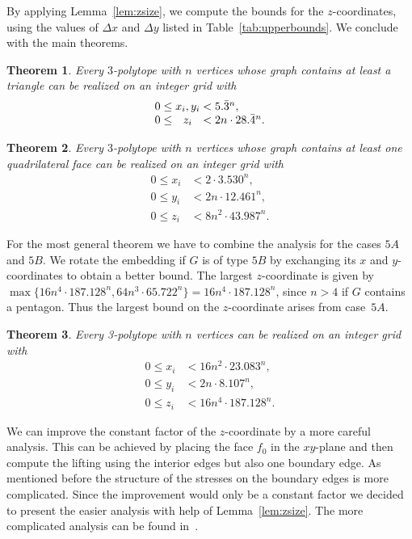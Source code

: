 \documentclass{article}
\theoremstyle{plain} \newtheorem{thm}{Theorem}[section]
\begin{document}
By applying Lemma~\ref{lem:zsize}, we compute the bounds for
the $z$-coordina\-tes, using the values of $\Delta x$ and $\Delta y$
listed in
Table~\ref{tab:upperbounds}. We conclude with the main
theorems.
\begin{thm}
Every $3$-polytope with $n$ vertices whose graph contains at least a triangle can
be realized on an integer grid with 
  \[\setlength{\arraycolsep}{0pt}
\begin{array}{rcl}
    0  \leq{}& x_i,y_i&{} <   5.\bar{3}^n, \\
    0 \leq{}& z_i&{} <   2 n \cdot 28.\bar{4}^n. \\
  \end{array}\]
\end{thm}
\begin{thm}\label{thm:4gon}
Every $3$-polytope with $n$ vertices 
whose graph contains at least one quadrilateral face can
be realized on an integer grid with 
  \begin{align*}
   0  \leq  x_i & <  2 \cdot 3{.}530^n, \\
   0  \leq  y_i & <  2 n \cdot 12{.}46	1^n, \\
   0  \leq  z_i & <  8 n^2 \cdot 43{.}987^n. 
  \end{align*}
\end{thm}
For the most general theorem we have to combine the analysis for the
cases $5A$ and $5B$. We rotate the embedding if $G$ is of type $5B$ by
exchanging its $x$ and $y$-coordinates to obtain a better bound. The
largest $z$-coordinate is given by
$\max\{16 n^4 \cdot 187{.}128^n,64n^3 \cdot 65{.}722^n\}
= 16 n^4 \cdot 187.128^n$,
since $n> 4$ if $G$ contains a
pentagon.
Thus the largest bound on the $z$-coordinate arises from case~$5A$.
\begin{thm}\label{thm:mainresult}
Every 3-polytope with $n$ vertices can be realized on an integer grid with
\begin{align*}
   0  \leq  x_i & <   16 n^2 \cdot 23{.}083^n, \\
   0  \leq  y_i & <  2n  \cdot 8.107^n, \\
   0  \leq  z_i & <  16 n^4 \cdot 187.128^n. 
 \end{align*}
\end{thm}
 We can improve the constant factor of the $z$-coordinate
by a more careful analysis. This can be achieved by placing the face
$f_0$ in the $xy$-plane and then compute the lifting using the
interior edges but also one boundary edge. As mentioned before the
structure of the stresses on the boundary edges is more
complicated. Since the improvement would only be a constant factor we decided
to present the easier analysis with help of Lemma~\ref{lem:zsize}. The
more complicated analysis can be found in~\cite{rrs-epsg-07}. 
\end{document}
